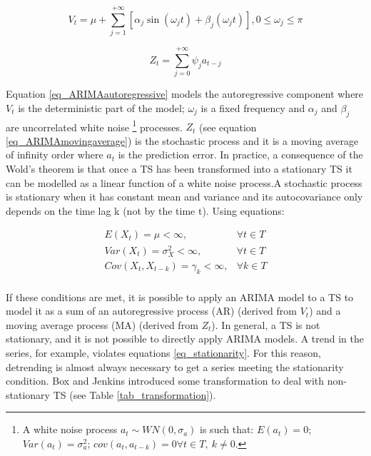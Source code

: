 \begin{equation}
V_t=\mu+\sum_{j=1}^{+\infty}\left[\alpha_j\sin{\left(\omega_jt\right)}+\beta_j\left(\omega_jt\right)\right],0\le\omega_j\le\pi
\label{eq_ARIMAautoregressive}
\end{equation}

\begin{equation}
Z_t=\sum_{j=0}^{+\infty}{\psi_ja_{t-j}}
\label{eq_ARIMAmovingaverage}
\end{equation}

Equation \ref{eq_ARIMAautoregressive} models the autoregressive component where $V_t$ is the deterministic part of the model; $\omega_j$ is a fixed frequency and $\alpha_j$ and $\beta_j$ are uncorrelated white noise \footnote{A white noise process $a_t \sim WN\left(0,\sigma_a\right)$ is such that: $E\left(a_t\right)=0$; $Var\left(a_t\right)=\sigma_a^2$; $cov\left(a_t,a_{t-k}\right)=0 \forall t\in T,\ k\neq0$.} processes. $Z_t$ (see equation \ref{eq_ARIMAmovingaverage}) is the stochastic process and it is a moving average of infinity order where $a_t$ is the prediction error. In practice, a consequence of the Wold’s theorem is that once a TS has been transformed into a stationary TS it can be modelled as a linear function of a white noise process.A stochastic process is stationary when it has constant mean and variance and its autocovariance only depends on the time lag k (not by the time t). Using equations:

\begin{equation}
\begin{split}
    E\left(X_t\right)=\mu<\infty,\ & \forall t\in T\\
    Var\left(X_t\right)=\sigma_X^2<\infty,\ & \forall t\in T\\
    Cov\left(X_t,X_{t-k}\right)=\gamma_k<\infty,& \forall k\in T\\
\end{split}
\label{eq_stationarity}
\end{equation}

If these conditions are met, it is possible to apply an ARIMA model to a TS to model it as a sum of an autoregressive process (AR) (derived from $V_t$) and a moving average process (MA) (derived from $Z_t$). In general, a TS is not stationary, and it is not possible to directly apply ARIMA models. A trend in the series, for example, violates equations \ref{eq_stationarity}. For this reason, detrending is almost always necessary to get a series meeting the stationarity condition. Box and Jenkins \cite{Box1970} introduced some transformation to deal with non-stationary TS (see Table \ref{tab_transformation}).



